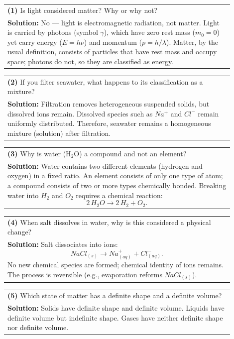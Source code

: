\documentclass{article}
\begin{document}
\begin{tabular}{|p{0.9\linewidth}|}
\hline
\textbf{(1)} Is light considered matter? Why or why not? \\ 
\textbf{Solution:} No — light is electromagnetic radiation, not matter. Light is carried by photons (symbol $\gamma$), which have zero rest mass ($m_0 = 0$) yet carry energy ($E = h\nu$) and momentum ($p = h/\lambda$). Matter, by the usual definition, consists of particles that have rest mass and occupy space; photons do not, so they are classified as energy. \\ \hline
\end{tabular}
\newpage
\begin{tabular}{|p{0.9\linewidth}|}
\hline
\textbf{(2)} If you filter seawater, what happens to its classification as a mixture? \\ 
\textbf{Solution:} Filtration removes heterogeneous suspended solids, but dissolved ions remain. Dissolved species such as $Na^+$ and $Cl^-$ remain uniformly distributed. Therefore, seawater remains a homogeneous mixture (solution) after filtration. \\ \hline
\end{tabular}
\newpage
\begin{tabular}{|p{0.9\linewidth}|}
\hline
\textbf{(3)} Why is water (H$_2$O) a compound and not an element? \\ 
\textbf{Solution:} Water contains two different elements (hydrogen and oxygen) in a fixed ratio. An element consists of only one type of atom; a compound consists of two or more types chemically bonded. Breaking water into $H_2$ and $O_2$ requires a chemical reaction: $$2\,H_2O \rightarrow 2\,H_2 + O_2.$$ \\ \hline
\end{tabular}
\newpage
\begin{tabular}{|p{0.9\linewidth}|}
\hline
\textbf{(4)} When salt dissolves in water, why is this considered a physical change? \\
\textbf{Solution:} Salt dissociates into ions: $$NaCl_{(s)} \rightarrow Na^+_{(aq)} + Cl^-_{(aq)}.$$ No new chemical species are formed; chemical identity of ions remains. The process is reversible (e.g., evaporation reforms $NaCl_{(s)}$). \\ \hline
\end{tabular}
\newpage
\begin{tabular}{|p{0.9\linewidth}|}
\hline
\textbf{(5)} Which state of matter has a definite shape and a definite volume? \\
\textbf{Solution:} Solids have definite shape and definite volume. Liquids have definite volume but indefinite shape. Gases have neither definite shape nor definite volume. \\ \hline
\end{tabular}
\end{document}
